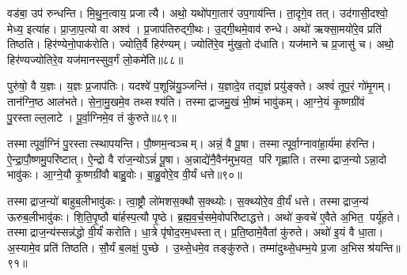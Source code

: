 वड॑बा॒ उप॑ रुन्धन्ति। मि॒थु॒न॒त्वाय॒ प्रजात्यै। अथो॒ यथो॑पगा॒तार॑ उप॒गाय॑न्ति। ता॒दृगे॒व तत्। उद॑गासी॒दश्वो॒ मेध्य॒ इत्या॑ह। प्रा॒जा॒प॒त्यो वा अश्व॑। प्र॒जाप॑तिरुद्गी॒थः। उ॒द्गी॒थमे॒वाव॑ रुन्धे। अथो॑ ऋक्सा॒मयो॑रे॒व प्रति॑ तिष्ठति। हिर॑ण्येनो॒पाक॑रोति। ज्योति॒र्वै हिर॑ण्यम्। ज्योति॑रे॒व मु॑ख॒तो द॑धाति। यज॑माने च प्र॒जासु॑ च। अथो॒ हिर॑ण्यज्योतिरे॒व यज॑मानस्सुव॒र्गं लो॒कमे॑ति॥८८॥\anuvakamend[तथ्स उ॒पाक॑रोति च॒त्वारि॑ च]

पुरु॑षो॒ वै य॒ज्ञः। य॒ज्ञः प्र॒जाप॑तिः। यदश्वे॑ प॒शून्नि॑यु॒ञ्जन्ति॑। य॒ज्ञादे॒व तद्य॒ज्ञं प्रयु॑ङ्क्ते। अश्वं॑ तूप॒रं गो॑मृ॒गम्। तान॑ग्नि॒ष्ठ आल॑भते। से॒ना॒मु॒खमे॒व तथ्सश्य॑ति। तस्माद्राजमु॒खं भी॒ष्मं भावु॑कम्। आ॒ग्ने॒यं कृ॒ष्णग्री॑वं पु॒रस्ताल्ल॒लाटे। पू॒र्वा॒ग्निमे॒व तं कु॑रुते॥८९॥

तस्मात्पूर्वा॒ग्निं पु॒रस्तात्स्थापयन्ति। पौ॒ष्णम॒न्वञ्चम्। अन्नं॒ वै पू॒षा। तस्मात्पूर्वा॒ग्नावा॑हा॒र्य॑मा ह॑रन्ति। ऐ॒न्द्रा॒पौ॒ष्णमु॒परि॑ष्टात्। ऐ॒न्द्रो वै रा॑ज॒न्योऽन्नं॑ पू॒षा। अ॒न्नाद्ये॑नै॒वैन॑मुभ॒यत॒ परि॑ गृह्णाति। तस्माद्राज॒न्योऽन्ना॒दो भावु॑कः। आ॒ग्ने॒यौ कृ॒ष्णग्री॑वौ बाहु॒वोः। बा॒हु॒वोरे॒व वी॒र्यं धत्ते॥९०॥

तस्माद्राज॒न्यो॑ बाहुब॒लीभावु॑कः। त्वा॒ष्ट्रौ लो॑मशस॒क्थौ स॒क्थ्योः। स॒क्थ्योरे॒व वी॒र्यं॑ धत्ते। तस्माद्राज॒न्य॑ ऊरुब॒लीभावु॑कः। शि॒ति॒पृ॒ष्ठौ बा॑र्\mbox{}हस्प॒त्यौ पृ॒ष्ठे। ब्र॒ह्म॒व॒र्च॒समे॒वोपरि॑ष्टाद्धत्ते। अथो॑ क॒वचे॑ ए॒वैते अ॒भित॒ पर्यू॑हते। तस्माद्राज॒न्य॑स्सन्न॑द्धो वी॒र्यं॑ करोति। धा॒त्रे पृ॑षोद॒रम॒धस्तात्। प्र॒ति॒ष्ठामे॒वैतां कु॑रुते। अथो॑ इ॒यं वै धा॒ता। अ॒स्यामे॒व प्रति॑ तिष्ठति। सौ॒र्यं ब॒लक्षं॒ पुच्छे। उ॒थ्से॒धमे॒व तङ्कु॑रुते। तम्मा॑दुथ्से॒धम्भ॒ये प्र॒जा अ॒भिसश्र॑यन्ति॥९१॥



